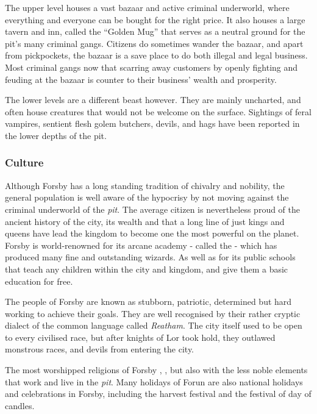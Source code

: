The upper level houses a vast bazaar and active criminal underworld, where
everything and everyone can be bought for the right price. It also houses a
large tavern and inn, called the ``Golden Mug'' that serves as a neutral
ground for the pit's many criminal gangs. Citizens do sometimes wander the
bazaar, and apart from pickpockets, the bazaar is a save place to do both
illegal and legal business. Most criminal gangs now that scarring away
customers by openly fighting and feuding at the bazaar is counter to their
business' wealth and prosperity.

The lower levels are a different beast however. They are mainly uncharted, and
often house creatures that would not be welcome on the surface. Sightings of
feral vampires, sentient flesh golem butchers, devils, and hags have been
reported in the lower depths of the pit.

\subsubsection{Culture}

Although Forsby has a long standing tradition of chivalry and nobility, the
general population is well aware of the hypocrisy by not moving against the
criminal underworld of the \emph{pit}. The average citizen is nevertheless
proud of the ancient history of the city, its wealth and that a long line of
just kings and queens have lead the kingdom to become one the most powerful on
the planet. Forsby is world-renowned for its arcane academy - called the
 - which has produced many fine and
outstanding wizards. As well as for its public schools that teach any children
within the city and kingdom, and give them a basic education for free.

The people of Forsby are known as stubborn, patriotic, determined but hard
working to achieve their goals. They are well recognised by their rather
cryptic dialect of the common language called \emph{Reatham}. The city itself
used to be open to every civilised race, but after knights of Lor took hold,
they outlawed monstrous races, and devils from entering the city.

The most worshipped religions of Forsby ,
, but also  with the less noble elements
that work and live in the \emph{pit}. Many holidays of Forun are also national
holidays and celebrations in Forsby, including the harvest festival and the
festival of day of candles.

